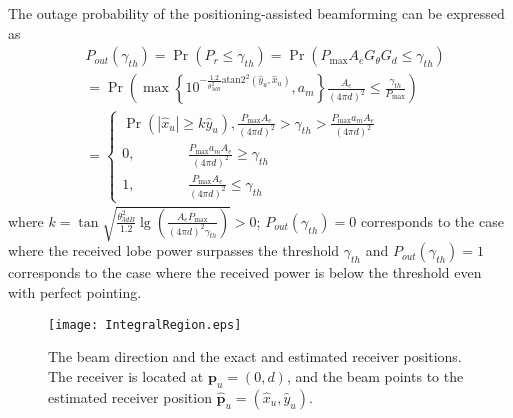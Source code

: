 \documentclass{IEEEtran}
\begin{document}
 The outage probability of the positioning-assisted beamforming can be expressed as
\begin{equation}\label{eq-6}
\begin{split}
&{P_{out}}\left( {{\gamma _{th}}} \right) = \Pr \left( {{P_r} \le {\gamma _{th}}} \right)= \Pr \left( {{P_{\max }}A_{e}{G_\theta }{G_d} \le {\gamma _{th}}} \right)\\
 &= \Pr \left( {\max \left\{ {{{10}^{ - \frac{{1.2}}{{\theta _{3dB}^2}}{{ \textrm{atan2} }^2}\left( {{{{{\hat y}_u}}},{{{{\hat x}_u}}}} \right)}},{a_m}} \right\}\frac{{{A_e}}}{{{{\left( {4\pi d} \right)}^2}}} \le \frac{{{\gamma _{th}}}}{{{P_{\max }}}}} \right)\\
 &= \left\{ \begin{array}{l}
\Pr \left( {\left| {{{\hat x}_u}} \right| \ge k{{\hat y}_u}} \right),\frac{{{P_{\max }}{A_e}}}{{{{\left( {4\pi d} \right)}^2}}} > {\gamma _{th}} > \frac{{{P_{\max }}{a_m}{A_e}}}{{{{\left( {4\pi d} \right)}^2}}}\\
0,\ \ \ \ \ \ \ \ \ \ \ \ \ \ \ \ \ \frac{{{P_{\max }}{a_m}{A_e}}}{{{{\left( {4\pi d} \right)}^2}}} \ge {\gamma _{th}}\\
1,\ \ \ \ \ \ \ \ \ \ \ \ \ \ \ \ \ \frac{{{P_{\max }}{A_e}}}{{{{\left( {4\pi d} \right)}^2}}} \le {\gamma _{th}}
\end{array} \right.
\end{split}
\end{equation}
where $k = \tan \sqrt {\frac{{\theta _{3dB}^2}}{{1.2}}\lg \left( {\frac{{{A_e}{P_{\max }}}}{{{{\left( {4\pi d} \right)}^2}{\gamma _{th}}}}} \right)}>0 $; ${P_{out}}\left( {{\gamma _{th}}} \right)=0$ corresponds to the case where the received lobe power surpasses the threshold $\gamma_{th}$ and ${P_{out}}\left( {{\gamma _{th}}} \right)=1$ corresponds to the case where the received power is below the threshold even with perfect pointing.

\begin{figure}
  \centering
  \texttt{[image: IntegralRegion.eps]}\\
  \caption{The beam direction and the exact and estimated receiver positions. The receiver is located at $\textbf{p}_u = (0,d)$, and the beam points to the estimated receiver position $\hat{ \textbf{p}}_u = (\hat x_u, \hat y_u)$. }\label{IntegralRegion}
\end{figure}
\end{document}
